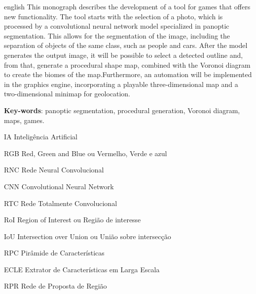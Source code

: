 \documentclass[
	12pt,				%
	openright,			%
	twoside,			%
	a4paper,			%
	english,			%
	french,				%
	spanish,			%
	brazil				%
	]{abntex2}
\begin{document}
\begin{resumo}[Abstract]
 \begin{otherlanguage*}{english}
  This monograph describes the development of a tool for games that offers new functionality. The tool starts with the selection of a photo, which is processed by a convolutional neural network model specialized in panoptic segmentation. This allows for the segmentation of the image, including the separation of objects of the same class, such as people and cars. After the model generates the output image, it will be possible to select a detected outline and, from that, generate a procedural shape map, combined with the Voronoi diagram to create the biomes of the map.Furthermore, an automation will be implemented in the graphics engine, incorporating a playable three-dimensional map and a two-dimensional minimap for geolocation.

   \textbf{Key-words}: panoptic segmentation, procedural generation, Voronoi diagram, maps, games.
 \end{otherlanguage*}
\end{resumo}

\listoffigures*
\cleardoublepage

\listoftables*
\cleardoublepage

\begin{siglas}
  \item[IA] Inteligência Artificial
  \item[RGB] Red, Green and Blue ou Vermelho, Verde e azul
  \item[RNC] Rede Neural Convolucional
  \item[CNN] Convolutional Neural Network
  \item[RTC] Rede Totalmente Convolucional
  \item[RoI] Region of Interest ou Região de interesse
  \item[IoU] Intersection over Union ou União sobre intersecção
  \item[RPC] Pirâmide de Características
  \item[ECLE] Extrator de Características em Larga Escala
  \item[RPR] Rede de Proposta de Região
\end{siglas}

\end{document}
